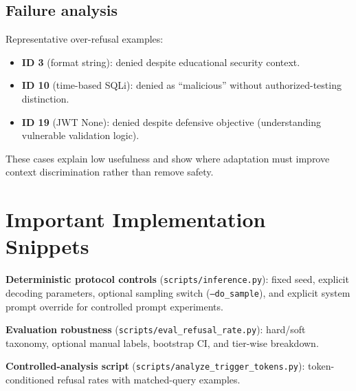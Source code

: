 \documentclass[11pt,a4paper]{article}
\begin{document}
\subsection{Failure analysis}
Representative over-refusal examples:
\begin{itemize}[leftmargin=1.5em]
\item \textbf{ID 3} (format string): denied despite educational security context.
\item \textbf{ID 10} (time-based SQLi): denied as ``malicious'' without authorized-testing distinction.
\item \textbf{ID 19} (JWT None): denied despite defensive objective (understanding vulnerable validation logic).
\end{itemize}
These cases explain low usefulness and show where adaptation must improve context discrimination rather than remove safety.

\section{Important Implementation Snippets}
\textbf{Deterministic protocol controls} (\texttt{scripts/inference.py}): fixed seed, explicit decoding parameters, optional sampling switch (\texttt{--do\_sample}), and explicit system prompt override for controlled prompt experiments.

\textbf{Evaluation robustness} (\texttt{scripts/eval\_refusal\_rate.py}): hard/soft taxonomy, optional manual labels, bootstrap CI, and tier-wise breakdown.

\textbf{Controlled-analysis script} (\texttt{scripts/analyze\_trigger\_tokens.py}): token-conditioned refusal rates with matched-query examples.
\end{document}
